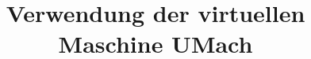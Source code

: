 \documentclass[fontsize=12pt,parskip=full,index=totoc,listof=totoc,titlepage]
{scrartcl}
\title{Verwendung der virtuellen Maschine UMach}
\author{}
\begin{document}
\maketitle
\tableofcontents












\appendix
\lstlistoflistings
\end{document}
